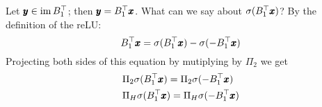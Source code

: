 \documentclass{mynotes}
\begin{document}
\begin{remark}

      Let \( \pmb{y}  \in \operatorname{im} B_1^\top \); then \( \pmb{y} = B_1^\top \pmb{x} \). What can we say about \( \sigma (B_1^\top \pmb{x} ) \)? By the definition of the reLU:
      \begin{equation}
            B_1^\top \pmb{x}  = \sigma( B_1^\top \pmb{x} ) - \sigma( - B_1^\top \pmb{x} )
      \end{equation}
      Projecting both sides of this equation by mutiplying by \( \Pi_2 \) we get
      \begin{equation}
            \begin{aligned}
                  & \Pi_2 \sigma (B_1^\top \pmb{x} ) = \Pi_2 \sigma ( - B_1^\top \pmb{x} ) \\
                  & \Pi_H \sigma (B_1^\top \pmb{x} ) = \Pi_H \sigma ( - B_1^\top \pmb{x} )
            \end{aligned}
      \end{equation}
\end{remark}




































\vspace{50pt}

      \nocite{*}
      
      
\end{document}
